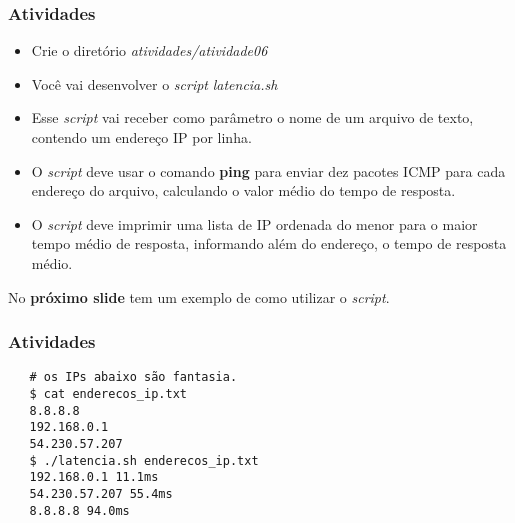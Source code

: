 \documentclass{beamer}
\begin{document}
   \begin{frame}
      \frametitle{Atividades}
      \begin{itemize}
         \item Crie o diretório \textit{atividades/atividade06}
	 \item Você vai desenvolver o \textit{script} \textit{latencia.sh}
	 \item Esse \textit{script} vai receber como parâmetro o nome de um arquivo de texto, contendo um endereço IP por linha.
	 \item O \textit{script} deve usar o comando \textbf{ping} para enviar dez pacotes ICMP para cada endereço do arquivo, calculando o valor médio do tempo de resposta.
	 \item O \textit{script} deve imprimir uma lista de IP ordenada do menor para o maior tempo médio de resposta, informando além do endereço, o tempo de resposta médio.
      \end{itemize}
      No \textbf{próximo slide} tem um exemplo de como utilizar o \textit{script}.
   \end{frame}

   \begin{frame}[fragile]
   \frametitle{Atividades}
   \begin{verbatim}
   # os IPs abaixo são fantasia. 
   $ cat enderecos_ip.txt
   8.8.8.8
   192.168.0.1
   54.230.57.207
   $ ./latencia.sh enderecos_ip.txt
   192.168.0.1 11.1ms
   54.230.57.207 55.4ms
   8.8.8.8 94.0ms
   \end{verbatim}
\end{frame}
\end{document}
